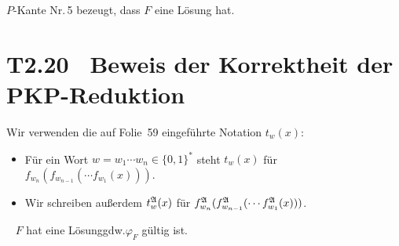 \documentclass[fontsize=11pt, twoside=false, numbers=autoenddot]{scrbook}
\begin{document}
\begin{center}
%
\end{center}

$P$-Kante Nr.\,5 bezeugt, dass $F$ eine Lösung hat.

\section*{T2.20~ Beweis der Korrektheit der PKP-Reduktion}

Wir verwenden die auf Folie~59 eingeführte Notation $t_w(x)$:
\begin{itemize}
  \item
    F\"ur ein Wort $w=w_1 \cdots w_n \in \{0,1\}^*$ steht $t_w(x)$ f\"ur $f_{w_n}(f_{w_{n-1}}(\cdots f_{w_1}(x)))$.
  \item
    Wir schreiben außerdem $t_w^\mathfrak{A}(x)$ f\"ur $f_{w_n}^\mathfrak{A}(f_{w_{n-1}}^\mathfrak{A}(\cdots f_{w_1}^\mathfrak{A}(x)))$.
\end{itemize}

\par\medskip\noindent
{}~
$F$ hat eine L\"osung\quad gdw.\quad $\varphi_F$ g\"ultig ist.
\end{document}
